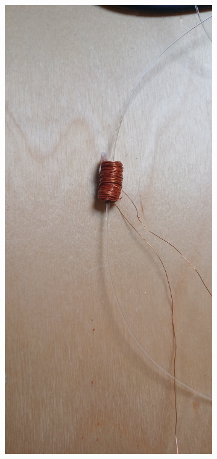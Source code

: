 \begin{figure}[H]
\begin{subfigure}{0.7\textwidth}
		\includegraphics[width=\textwidth]{pictures/Schwingspule_lang.jpg}

\end{subfigure}
\end{figure}
